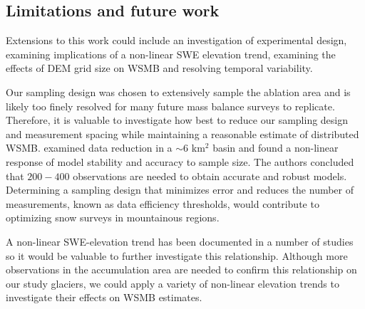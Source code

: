 \documentclass[twocolumn,letterpaper]{igs}
\begin{document}
\subsection{Limitations and future work}

Extensions to this work could include an investigation of experimental design, examining implications of a non-linear SWE elevation trend, examining the effects of DEM grid size on WSMB and resolving temporal variability. 

Our sampling design was chosen to extensively sample the ablation area and is likely too finely resolved for many future mass balance surveys to replicate. Therefore, it is valuable to investigate how best to reduce our sampling design and measurement spacing while maintaining a reasonable estimate of distributed WSMB. \cite{Lopez2010} examined data reduction in a $\sim$6 km$^2$ basin and found a non-linear response of model stability and accuracy to sample size. The authors concluded that $200-400$ observations are needed to obtain accurate and robust models. Determining a sampling design that minimizes error and reduces the number of measurements, known as data efficiency thresholds, would contribute to optimizing snow surveys in mountainous regions. 

A non-linear SWE-elevation trend has been documented in a number of studies so it would be valuable to further investigate this relationship. Although more observations in the accumulation area are needed to confirm this relationship on our study glaciers, we could apply a variety of non-linear elevation trends to investigate their effects on WSMB estimates. 
\end{document}
